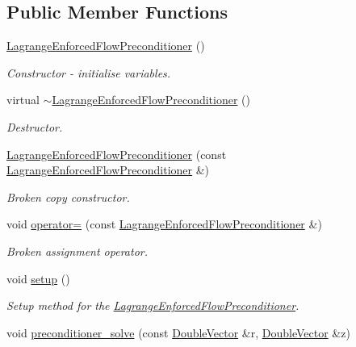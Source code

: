 \subsection*{Public Member Functions}
\begin{DoxyCompactItemize}
\item 
\hyperlink{classoomph_1_1LagrangeEnforcedFlowPreconditioner_a807a1c5694e8b2114e0da3702db00d68}{Lagrange\+Enforced\+Flow\+Preconditioner} ()
\begin{DoxyCompactList}\small\item\em Constructor -\/ initialise variables. \end{DoxyCompactList}\item 
virtual \hyperlink{classoomph_1_1LagrangeEnforcedFlowPreconditioner_a9958f85a43c683c5a97b449faa35ca74}{$\sim$\+Lagrange\+Enforced\+Flow\+Preconditioner} ()
\begin{DoxyCompactList}\small\item\em Destructor. \end{DoxyCompactList}\item 
\hyperlink{classoomph_1_1LagrangeEnforcedFlowPreconditioner_a90dec29da0af3f3df074f5260982c730}{Lagrange\+Enforced\+Flow\+Preconditioner} (const \hyperlink{classoomph_1_1LagrangeEnforcedFlowPreconditioner}{Lagrange\+Enforced\+Flow\+Preconditioner} \&)
\begin{DoxyCompactList}\small\item\em Broken copy constructor. \end{DoxyCompactList}\item 
void \hyperlink{classoomph_1_1LagrangeEnforcedFlowPreconditioner_a86ada15275cece9fc9529c6a9b3373d1}{operator=} (const \hyperlink{classoomph_1_1LagrangeEnforcedFlowPreconditioner}{Lagrange\+Enforced\+Flow\+Preconditioner} \&)
\begin{DoxyCompactList}\small\item\em Broken assignment operator. \end{DoxyCompactList}\item 
void \hyperlink{classoomph_1_1LagrangeEnforcedFlowPreconditioner_aadcbdb5af92d7889c956098cb86dee87}{setup} ()
\begin{DoxyCompactList}\small\item\em Setup method for the \hyperlink{classoomph_1_1LagrangeEnforcedFlowPreconditioner}{Lagrange\+Enforced\+Flow\+Preconditioner}. \end{DoxyCompactList}\item 
void \hyperlink{classoomph_1_1LagrangeEnforcedFlowPreconditioner_a519940fc2faee5faac00b80004f3edea}{preconditioner\+\_\+solve} (const \hyperlink{classoomph_1_1DoubleVector}{Double\+Vector} \&r, \hyperlink{classoomph_1_1DoubleVector}{Double\+Vector} \&z)

\end{DoxyCompactItemize}
